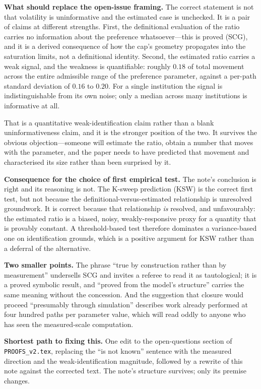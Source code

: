 \documentclass[11pt]{article}
\begin{document}
\bigskip
\noindent\textbf{What should replace the open-issue framing.}
The correct statement is not that volatility is uninformative and the
estimated case is unchecked. It is a pair of claims at different
strengths. First, the definitional evaluation of the ratio carries no
information about the preference whatsoever---this is proved (SCG), and it
is a derived consequence of how the cap's geometry propagates into the
saturation limits, not a definitional identity. Second, the estimated
ratio carries a weak signal, and the weakness is quantifiable: roughly
$0.18$ of total movement across the entire admissible range of the
preference parameter, against a per-path standard deviation of $0.16$ to
$0.20$. For a single institution the signal is indistinguishable from its
own noise; only a median across many institutions is informative at all.

That is a quantitative weak-identification claim rather than a blank
uninformativeness claim, and it is the stronger position of the two. It
survives the obvious objection---someone will estimate the ratio, obtain a
number that moves with the parameter, and the paper needs to have
predicted that movement and characterised its size rather than been
surprised by it.

\bigskip
\noindent\textbf{Consequence for the choice of first empirical test.}
The note's conclusion is right and its reasoning is not. The K-sweep
prediction (KSW) is the correct first test, but not because the
definitional-versus-estimated relationship is unresolved groundwork. It is
correct because that relationship \emph{is} resolved, and unfavourably:
the estimated ratio is a biased, noisy, weakly-responsive proxy for a
quantity that is provably constant. A threshold-based test therefore
dominates a variance-based one on identification grounds, which is a
positive argument for KSW rather than a deferral of the alternative.

\bigskip
\noindent\textbf{Two smaller points.}
The phrase ``true by construction rather than by measurement'' undersells
SCG and invites a referee to read it as tautological; it is a proved
symbolic result, and ``proved from the model's structure'' carries the
same meaning without the concession. And the suggestion that closure would
proceed ``presumably through simulation'' describes work already performed
at four hundred paths per parameter value, which will read oddly to anyone
who has seen the measured-scale computation.

\bigskip
\noindent\textbf{Shortest path to fixing this.}
One edit to the open-questions section of \texttt{PROOFS\_v2.tex},
replacing the ``is not known'' sentence with the measured direction and
the weak-identification magnitude, followed by a rewrite of this note
against the corrected text. The note's structure survives; only its
premise changes.
\end{document}
